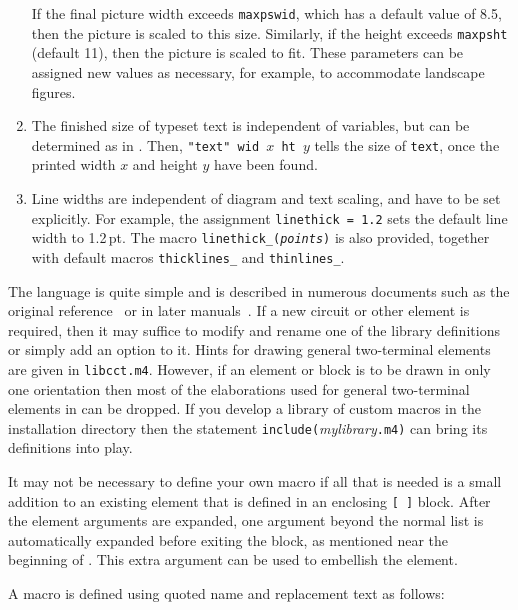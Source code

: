 \begin{enumerate}
  If the final picture width exceeds {\tt maxpswid}, which
  has a default value of 8.5, then the picture is scaled to this size.
  Similarly, if the height exceeds {\tt maxpsht} (default 11), then the
  picture is scaled to fit.  These parameters can be assigned
  new values as necessary, for example, to accommodate landscape figures.

\item The finished size of typeset text is independent of \pic variables,
  but can be determined as in .  Then,
  {\tt "text" wid $x$ ht $y$} tells \pic the size of {\tt text},
  once the printed width $x$ and height $y$ have been found.

\item Line widths are independent of diagram and text scaling, and have
  to be set explicitly.  For example,
  the assignment {\tt linethick = 1.2} sets the default line width to 1.2\,pt.
  The macro {\tt linethick\_({\sl points})} is also provided, together
  with default macros {\tt thicklines\_} and {\tt thinlines\_}.

\end{enumerate}

The \Mfour language is quite simple and is
described in numerous documents such as the original reference~\cite{KRm4}
or in later manuals~\cite{Seindal94}.  If a new circuit
or other element is required, then it may suffice to modify and rename one of
the library definitions or simply add an option to it.
Hints for drawing general two-terminal elements are given in
{\tt libcct.m4}.  However, if an element or block is to be drawn in
only one orientation then most of the elaborations used for general
two-terminal elements in  can be dropped.
If you develop a library of custom macros in the installation
directory then the statement {\tt include(}{\sl mylibrary}{\tt.m4)}
can bring its definitions into play.

\enlargethispage{\baselineskip}
It may not be necessary to define your own macro if all that is needed is
a small addition to an existing element that is defined in an enclosing
\verb|[ ]| block.  After the element arguments are expanded,
one argument beyond the normal list is automatically expanded before
exiting the block, as mentioned near the beginning of .
This extra argument can be used to embellish the element.  

A macro is defined using quoted name and replacement text as follows:

